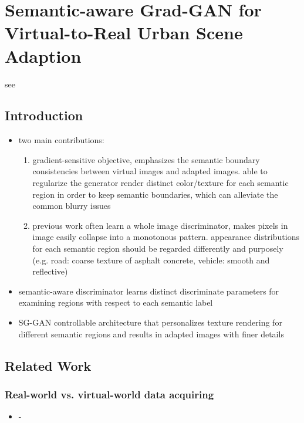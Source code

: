 \newpage

\section{Semantic-aware Grad-GAN for Virtual-to-Real Urban Scene Adaption}

see \cite{DBLP:journals/corr/abs-1801-01726}

\subsection{Introduction}
\begin{itemize}
	\item two main contributions: 
		\begin{enumerate}
			\item gradient-sensitive objective, emphasizes the semantic boundary consistencies between virtual images and adapted images. able to regularize the generator render distinct color/texture for each semantic region in order to keep semantic boundaries, which can alleviate the common blurry issues
			\item previous work often learn a whole image discriminator, makes pixels in image easily collapse into a monotonous pattern. appearance distributions for each semantic region should be regarded differently and purposely (e.g. road: coarse texture of asphalt concrete, vehicle: smooth and reflective)
		\end{enumerate}
	\item semantic-aware discriminator learns distinct discriminate parameters for examining regions with respect to each semantic label
	\item SG-GAN controllable architecture that personalizes texture rendering for different semantic regions and results in adapted images with finer details
\end{itemize}

\subsection{Related Work}
\subsubsection{Real-world vs. virtual-world data acquiring}
\begin{itemize}
	\item -
\end{itemize}
